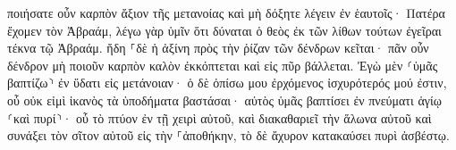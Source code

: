 \documentclass{openreader}
\begin{document}
ποιήσατε οὖν καρπὸν ἄξιον τῆς μετανοίας 
καὶ μὴ δόξητε λέγειν ἐν ἑαυτοῖς· Πατέρα ἔχομεν τὸν Ἀβραάμ, λέγω γὰρ ὑμῖν ὅτι δύναται ὁ θεὸς ἐκ τῶν λίθων τούτων ἐγεῖραι τέκνα τῷ Ἀβραάμ. 
ἤδη ⸀δὲ ἡ ἀξίνη πρὸς τὴν ῥίζαν τῶν δένδρων κεῖται· πᾶν οὖν δένδρον μὴ ποιοῦν καρπὸν καλὸν ἐκκόπτεται καὶ εἰς πῦρ βάλλεται. 
Ἐγὼ μὲν ⸂ὑμᾶς βαπτίζω⸃ ἐν ὕδατι εἰς μετάνοιαν· ὁ δὲ ὀπίσω μου ἐρχόμενος ἰσχυρότερός μού ἐστιν, οὗ οὐκ εἰμὶ ἱκανὸς τὰ ὑποδήματα βαστάσαι· αὐτὸς ὑμᾶς βαπτίσει ἐν πνεύματι ἁγίῳ ⸂καὶ πυρί⸃· 
οὗ τὸ πτύον ἐν τῇ χειρὶ αὐτοῦ, καὶ διακαθαριεῖ τὴν ἅλωνα αὐτοῦ καὶ συνάξει τὸν σῖτον αὐτοῦ εἰς τὴν ⸀ἀποθήκην, τὸ δὲ ἄχυρον κατακαύσει πυρὶ ἀσβέστῳ. 
\end{document}
